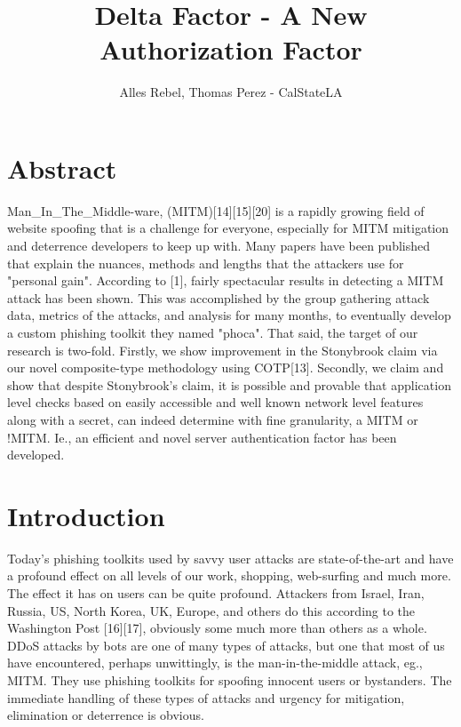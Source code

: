 \documentclass[a4paper, 11pt]{article} 				%
\title{Delta Factor - A New Authorization Factor}
\author{Alles Rebel, Thomas Perez - CalStateLA}
\begin{document}
\maketitle



\section{Abstract}
\setlength{\baselineskip}{1.5\baselineskip}
\noindent
Man\_In\_The\_Middle-ware, (MITM)[14][15][20] is a rapidly growing field of website spoofing that is a challenge for everyone, especially for MITM mitigation and deterrence  developers to keep up with. Many papers have been published that explain the nuances, methods and lengths that the attackers use for "personal gain". According to [1], fairly spectacular results in detecting a MITM attack has been shown. This was accomplished by the group gathering attack data, metrics of the attacks, and analysis for many months, to eventually develop a custom phishing toolkit they named "phoca". That said, the target of our research is two-fold. Firstly, we show improvement in the Stonybrook claim via our novel composite-type methodology using COTP[13].  Secondly, we claim and show that despite Stonybrook's claim, it is possible and provable that application level checks based on easily accessible and well known network level features along with a secret, can indeed determine with fine granularity, a MITM or !MITM. Ie., an efficient and novel server authentication factor has been developed.  



\section{Introduction}
\noindent
Today’s phishing toolkits used by savvy user attacks are state-of-the-art and have a profound effect on all levels of our work, shopping, web-surfing and much more. The effect it has on users can be quite profound. Attackers from Israel, Iran, Russia, US, North Korea, UK, Europe, and others do this according to the Washington Post [16][17], obviously some much more than others as a whole. DDoS attacks by bots are one of many types of attacks, but one that most of us have encountered, perhaps unwittingly, is the  man-in-the-middle attack, eg., MITM. They use phishing toolkits for spoofing innocent users or bystanders. The immediate handling of these types of attacks and urgency for mitigation, elimination or deterrence is obvious. 
\end{document}
